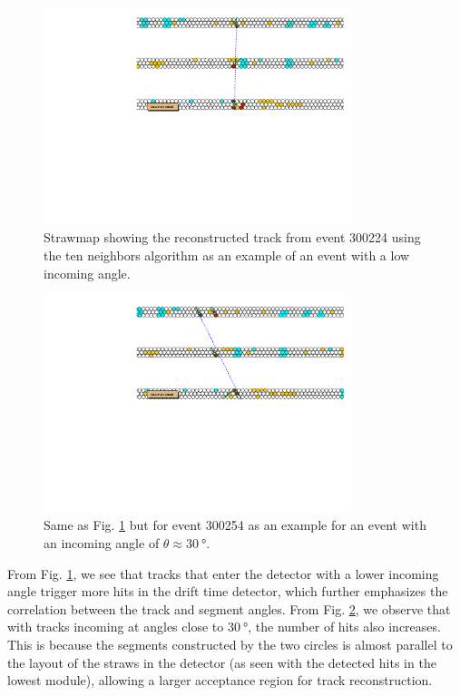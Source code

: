 \documentclass[a4paper]{report}
\numberwithin{equation}{section}
\begin{document}
\begin{figure}[htb!]
	\centering
	\includegraphics[width=0.8\textwidth]{event300224.pdf}
	\caption{Strawmap showing the reconstructed track from event 300224 using the ten neighbors algorithm as 
	an example of an event with a low incoming angle. }
	\label{fig:strawmap_300224}
\end{figure}

\begin{figure}[ht!]
	\centering
	\includegraphics[width=0.8\textwidth]{event300254.pdf}
	\caption{Same as Fig. \ref{fig:strawmap_300224} but for event 300254 as an example for an event with an incoming angle of 
	$\theta \approx \SI{30}{\degree}$. }
	\label{fig:strawmap_300254}
\end{figure}

From Fig. \ref{fig:strawmap_300224}, we see that tracks that enter the detector with a lower incoming angle trigger more hits in the 
drift time detector, which further emphasizes the correlation between the track and segment angles. From Fig. \ref{fig:strawmap_300254}, we observe that with tracks incoming at angles close to $\SI{30}{\degree}$, the number of hits also increases. This is because 
the segments constructed by the two circles is almost parallel to the layout of the straws in the detector (as seen with the detected hits 
in the lowest module), allowing a larger acceptance region for track reconstruction. 
\null
\vfill
\end{document}
